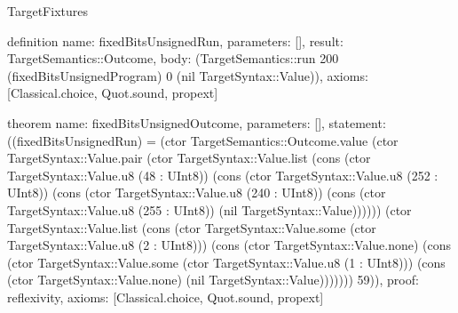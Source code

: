 \begin{lexlean}{TargetFixtures}
\begin{semanticmodule}
definition{
  name: fixedBitsUnsignedRun,
  parameters: [],
  result: TargetSemantics::Outcome,
  body: (TargetSemantics::run 200 (fixedBitsUnsignedProgram) 0 (nil TargetSyntax::Value)),
  axioms: [Classical.choice, Quot.sound, propext]
}

theorem{
  name: fixedBitsUnsignedOutcome,
  parameters: [],
  statement: ((fixedBitsUnsignedRun) = (ctor TargetSemantics::Outcome.value (ctor TargetSyntax::Value.pair (ctor TargetSyntax::Value.list (cons (ctor TargetSyntax::Value.u8 (48 : UInt8)) (cons (ctor TargetSyntax::Value.u8 (252 : UInt8)) (cons (ctor TargetSyntax::Value.u8 (240 : UInt8)) (cons (ctor TargetSyntax::Value.u8 (255 : UInt8)) (nil TargetSyntax::Value)))))) (ctor TargetSyntax::Value.list (cons (ctor TargetSyntax::Value.some (ctor TargetSyntax::Value.u8 (2 : UInt8))) (cons (ctor TargetSyntax::Value.none) (cons (ctor TargetSyntax::Value.some (ctor TargetSyntax::Value.u8 (1 : UInt8))) (cons (ctor TargetSyntax::Value.none) (nil TargetSyntax::Value))))))) 59)),
  proof: reflexivity{},
  axioms: [Classical.choice, Quot.sound, propext]
}


\end{semanticmodule}
\end{lexlean}
